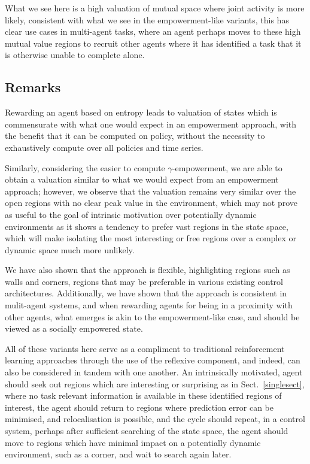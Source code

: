 \documentclass{article}
\begin{document}
What we see here is a high valuation of mutual space where joint activity is more likely, consistent with what we see in the empowerment-like variants, this has clear use cases in multi-agent tasks, where an agent perhaps moves to these high mutual value regions to recruit other agents where it has identified a task that it is otherwise unable to complete alone.

\subsection{Remarks}
Rewarding an agent based on entropy leads to valuation of states which is commensurate with what one would expect in an empowerment approach, with the benefit that it can be computed on policy, without the necessity to exhaustively compute over all policies and time series.

Similarly, considering the easier to compute $\gamma$-empowerment, we are able to obtain a valuation similar to what we would expect from an empowerment approach; however, we observe that the valuation remains very similar over the open regions with no clear peak value in the environment, which may not prove as useful to the goal of intrinsic motivation over potentially dynamic environments as it shows a tendency to prefer vast regions in the state space, which will make isolating the most interesting or free regions over a complex or dynamic space much more unlikely.

We have also shown that the approach is flexible, highlighting regions such as walls and corners, regions that may be preferable in various existing control architectures. Additionally, we have shown that the approach is consistent in mulit-agent systems, and when rewarding agents for being in a proximity with other agents, what emerges is akin to the empowerment-like case, and should be viewed as a socially empowered state.


All of these variants here serve as a compliment to traditional reinforcement learning approaches through the use of the reflexive component, and indeed, can also be considered in tandem with one another. An intrinsically motivated, agent should seek out regions which are interesting or surprising as in Sect.~\ref{singlesect}, where no task relevant information is available in these identified regions of interest, the agent should return to regions where prediction error can be minimised, and relocalisation is possible, and the cycle should repeat, in a control system, perhaps after sufficient searching of the state space, the agent should move to regions which have minimal impact on a potentially dynamic environment, such as a corner, and wait to search again later.
\end{document}
